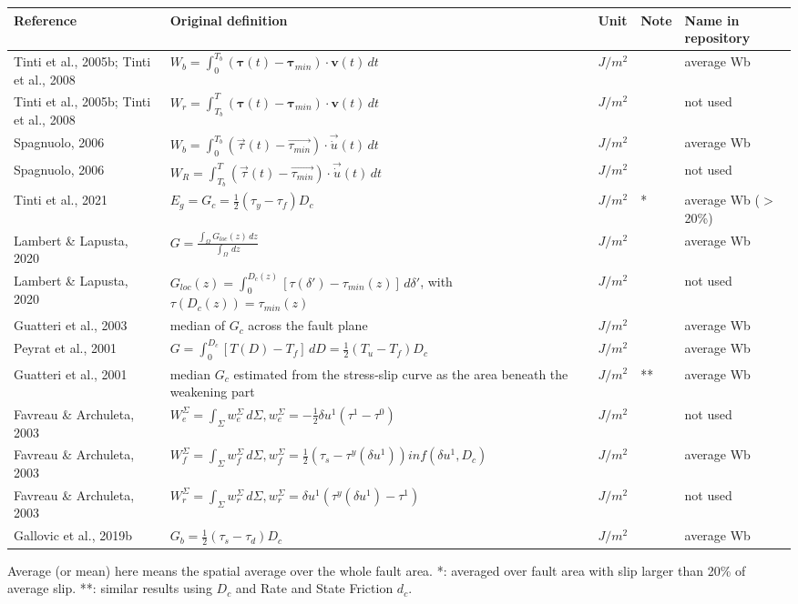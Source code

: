 \documentclass[12pt]{article}
\begin{document}
\begin{longtable}{|p{3.5 cm}|p{6.5 cm}|p{1.25 cm}|p{1.25 cm}|p{1.5 cm}|}
\hline
\textbf{Reference} & \textbf{Original definition} & \textbf{Unit} & \textbf{Note} & \textbf{Name in repository} \\ \hline
Tinti et al., 2005b; Tinti et al., 2008 & \( \displaystyle W_b = \int_{0}^{T_b} (\bm{\tau}(t)-\bm{\tau}_{min})\cdot \bm{v}(t)\,dt \) & $J/m^2$ & & average Wb \\
Tinti et al., 2005b; Tinti et al., 2008 & \( \displaystyle W_r = \int_{T_b}^{T} (\bm{\tau}(t)-\bm{\tau}_{min})\cdot \bm{v}(t)\,dt \) & $J/m^2$ & & not used \\
Spagnuolo, 2006 & \( \displaystyle W_b = \int_{0}^{T_b} (\vec{\tau}(t)-\vec{\tau_{min}})\cdot \vec{\dot{u}}(t)\,dt \) & $J/m^2$ & & average Wb \\
Spagnuolo, 2006 & \( \displaystyle W_R = \int_{T_b}^{T} (\vec{\tau}(t)-\vec{\tau_{min}})\cdot \vec{\dot{u}}(t)\,dt \) & $J/m^2$ & & not used \\
Tinti et al., 2021 & \(\displaystyle E_g = G_c = \frac{1}{2} (\tau_y-\tau_f) D_c\) & $J/m^2$ & * & average Wb ($>$20\%) \\
Lambert \& Lapusta, 2020 & \( \displaystyle G = \frac{\int_{\Omega} G_{loc}(z) \,dz}{\int_{\Omega}\,dz} \) & $J/m^2$ & & average Wb \\
Lambert \& Lapusta, 2020 & \( \displaystyle G_{loc}(z) = \int_{0}^{D_c (z)} [\tau(\delta')-\tau_{min}(z)]\,d\delta' \), with $\tau(D_c(z)) = \tau_{min}(z)$ & $J/m^2$ & & not used \\
Guatteri et al., 2003 & median of $G_c$ across the fault plane & $J/m^2$ & & average Wb \\
Peyrat et al., 2001 & \( \displaystyle G=\int_{0}^{D_c} [T(D)-T_f]\,dD = \frac{1}{2}(T_u-T_f)D_c \) & $J/m^2$ & & average Wb \\
Guatteri et al., 2001 & median $G_c$ estimated from the stress-slip curve as the area beneath the weakening part & $J/m^2$ & ** & average Wb \\
Favreau \& Archuleta, 2003 & \( \displaystyle W_e^\Sigma = \int_{\Sigma} w_e^\Sigma\,d\Sigma, w_e^\Sigma = -\frac{1}{2} \delta u^1 (\tau^1-\tau^0) \) & $J/m^2$ & & not used \\
Favreau \& Archuleta, 2003 & \( \displaystyle W_f^\Sigma = \int_{\Sigma} w_f^\Sigma\,d\Sigma, w_f^\Sigma = \frac{1}{2} (\tau_s-\tau^y(\delta u^1)) inf(\delta u^1, D_c) \) & $J/m^2$ & & average Wb \\
Favreau \& Archuleta, 2003 & \( \displaystyle W_r^\Sigma = \int_{\Sigma} w_r^\Sigma\,d\Sigma, w_r^\Sigma = \delta u^1 (\tau^y (\delta u^1)-\tau^1) \) & $J/m^2$ & & not used \\
Gallovic et al., 2019b & \( \displaystyle G_b =\frac{1}{2}(\tau_s-\tau_d)D_c  \) & $J/m^2$ & & average Wb \\
\hline
\end{longtable}
Average (or mean) here means the spatial average over the whole fault area. *: averaged over fault area with slip larger than 20\% of average slip. **: similar results using $D_c$ and Rate and State Friction $d_c$.
\end{document}
